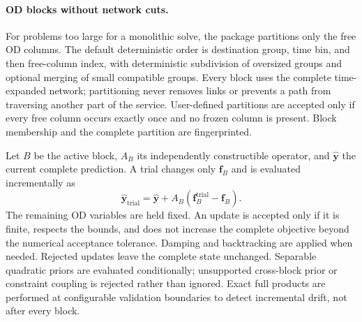 \paragraph{OD blocks without network cuts.}
For problems too large for a monolithic solve, the package partitions only the
free OD columns.  The default deterministic order is destination group, time
bin, and then free-column index, with deterministic subdivision of oversized
groups and optional merging of small compatible groups.  Every block uses the
complete time-expanded network; partitioning never removes links or prevents a
path from traversing another part of the service.  User-defined partitions are
accepted only if every free column occurs exactly once and no frozen column is
present.  Block membership and the complete partition are fingerprinted.

Let $B$ be the active block, $A_B$ its independently constructible operator,
and $\widehat{\bm y}$ the current complete prediction.  A trial changes only
$\bm f_B$ and is evaluated incrementally as
\[
\widehat{\bm y}_{\mathrm{trial}}
=\widehat{\bm y}+A_B
 (\bm f_B^{\mathrm{trial}}-\bm f_B).
\]
The remaining OD variables are held fixed.  An update is accepted only if it is
finite, respects the bounds, and does not increase the complete objective beyond
the numerical acceptance tolerance.  Damping and backtracking are applied when
needed.  Rejected updates leave the complete state unchanged.  Separable
quadratic priors are evaluated conditionally; unsupported cross-block prior or
constraint coupling is rejected rather than ignored.  Exact full products are
performed at configurable validation boundaries to detect incremental drift,
not after every block.

